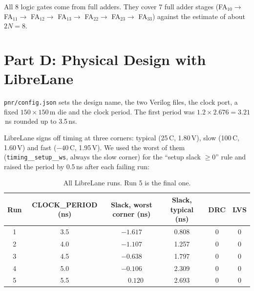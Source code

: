 \documentclass[11pt,a4paper]{article}
\begin{document}
All 8 logic gates come from full adders. They cover 7 full adder stages
(FA$_{10} \rightarrow$ FA$_{11} \rightarrow$ FA$_{12} \rightarrow$ FA$_{13} \rightarrow$ FA$_{22}
\rightarrow$ FA$_{23} \rightarrow$ FA$_{33}$) against the estimate of about $2N = 8$.

\section{Part D: Physical Design with LibreLane}

\texttt{pnr/config.json} sets the design name, the two Verilog files, the clock port, a fixed
$150 \times 150$\,\textmu m die and the clock period. The first period was
$1.2 \times 2.676 = 3.21$\,ns rounded up to 3.5\,ns.

LibreLane signs off timing at three corners: typical (25\,\textdegree C, 1.80\,V), slow
(100\,\textdegree C, 1.60\,V) and fast ($-40$\,\textdegree C, 1.95\,V). We used the worst of them
(\texttt{timing\_\_setup\_\_ws}, always the slow corner) for the ``setup slack $\geq 0$'' rule and
raised the period by 0.5\,ns after each failing run:

\begin{table}[H]
\centering
\small
\begin{tabular}{@{}cccccc@{}}
\toprule
Run & CLOCK\_PERIOD (ns) & Slack, worst corner (ns) & Slack, typical (ns) & DRC & LVS \\
\midrule
1 & 3.5 & $-1.617$ & 0.808 & 0 & 0 \\
2 & 4.0 & $-1.107$ & 1.257 & 0 & 0 \\
3 & 4.5 & $-0.638$ & 1.797 & 0 & 0 \\
4 & 5.0 & $-0.106$ & 2.309 & 0 & 0 \\
5 & 5.5 & $\phantom{-}0.120$ & 2.693 & 0 & 0 \\
\bottomrule
\end{tabular}
\caption{All LibreLane runs. Run 5 is the final one.}
\end{table}
\end{document}
